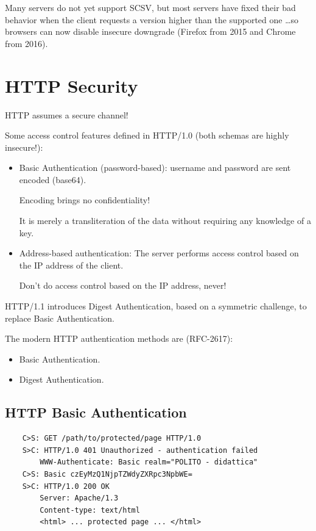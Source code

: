Many servers do not yet support SCSV, but most servers have fixed their bad behavior when the client requests a version higher than the supported one \dots so browsers can now disable insecure downgrade (Firefox from 2015 and Chrome from 2016).

\section{HTTP Security}
\begin{center}
    \large{HTTP assumes a secure channel!}
\end{center}

Some access control features defined in HTTP/1.0 (both schemas are highly insecure!):
\begin{itemize}
    \item Basic Authentication (password-based): username and password are sent encoded (base64).
    \begin{tcolorbox}[colback=red!10!white, colframe=red!70!black, coltitle=white, title=Beware]
        Encoding brings no confidentiality!

        It is merely a transliteration of the data without requiring any knowledge of a key.
        \end{tcolorbox}
    \item Address-based authentication: The server performs access control based on the IP address of the client.
    \begin{tcolorbox}[colback=red!10!white, colframe=red!70!black, coltitle=white, title=Beware]
    Don't do access control based on the IP address, never!
    \end{tcolorbox}
\end{itemize}

HTTP/1.1 introduces Digest Authentication, based on a symmetric challenge, to replace Basic Authentication.

\vspace{0.2cm}

\noindent The modern HTTP authentication methods are (RFC-2617):
\begin{itemize}
    \item Basic Authentication.
    \item Digest Authentication.
\end{itemize}

\subsection{HTTP Basic Authentication}
\begin{verbatim}
    C>S: GET /path/to/protected/page HTTP/1.0
    S>C: HTTP/1.0 401 Unauthorized - authentication failed
        WWW-Authenticate: Basic realm="POLITO - didattica"
    C>S: Basic czEyMzQ1NjpTZWdyZXRpc3NpbWE=
    S>C: HTTP/1.0 200 OK
        Server: Apache/1.3
        Content-type: text/html
        <html> ... protected page ... </html>
\end{verbatim}

